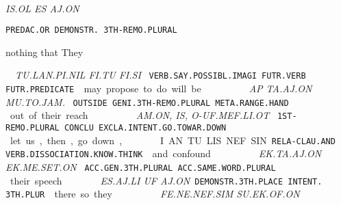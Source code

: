 {\is\ol~\es~\aj\on

{\it IS.OL		ES		AJ.ON	 }

{\tt PREDAC.OR	DEMONSTR.	3TH-REMO.PLURAL }

nothing 	that		They 	 

\drie 

 
\tu\lan\Atlanpi\Atlannil~\Atlanfi\tu~\Atlanfi\si

{\it TU.LAN.PI.NIL		               FI.TU		FI.SI }

{\tt VERB.SAY.POSSIBL.IMAGI	FUTR.VERB	FUTR.PREDICATE }

may propose			to do		will be 
\drie 

  

\ap~\ta\aj\on~\Atlanmu\Atlanto\jam\period

{\it AP		TA.AJ.ON			MU.TO.JAM. }

{\tt OUTSIDE	GENI.3TH-REMO.PLURAL	META.RANGE.HAND }

out 		of their 				reach.
\drie

  
\am\on~\is~\Atlano\uf\mef\li\ot

{\it AM.ON,     IS,   O-UF.MEF.LI.OT				 }

{\tt 1ST-REMO.PLURAL CONCLU EXCLA.INTENT.GO.TOWAR.DOWN             }

let us, then, go down, 			      	 

\drie
 

\Atlani\an~\tu\lis\nef\Atlansin

I.AN			TU.LIS.NEF.SIN      

{\tt RELA-CLAU.AND	VERB.DISSOCIATION.KNOW.THINK }

and  			confound  

\drie

\ek\ta\aj\on~\ek\me\set\on

{\it EK.TA.AJ.ON		EK.ME.SET.ON }

{\tt ACC.GEN.3TH.PLURAL             ACC.SAME.WORD.PLURAL	 	}

their 			speech

\drie

  

\es\aj\lu~\uf~\aj\on

{\it ES.AJ.LI				UF		AJ.ON}				 

{\tt DEMONSTR.3TH.PLACE        INTENT.		3TH.PLUR	 }

there			so 			they 		

\drie

\fe\Atlanne\nef\Atlansim~\su\ek\of\on

{\it FE.NE.NEF.SIM			SU.EK.OF.ON	 }

}
